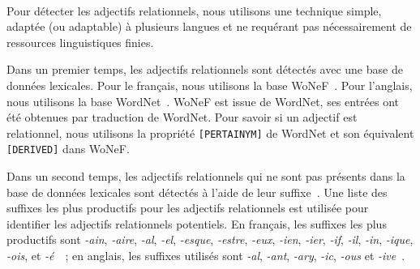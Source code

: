       ~\\Pour détecter les adjectifs relationnels, nous utilisons une technique
      simple, adaptée (ou adaptable) à plusieurs langues et ne requérant pas
      nécessairement de ressources linguistiques finies.

      Dans un premier temps, les adjectifs relationnels sont détectés avec une
      base de données lexicales. Pour le français, nous utilisons la base
      WoNeF~\cite{pradet2013wonef}. Pour l'anglais, nous
      utilisons la base  WordNet~\cite{miller1995wordnet}. WoNeF est issue de
      WordNet, ses entrées ont été obtenues par traduction de WordNet. Pour
      savoir si un adjectif est relationnel, nous utilisons la propriété
      \texttt{[PERTAINYM]} de WordNet et son équivalent \texttt{[DERIVED]} dans
      WoNeF.

      Dans un second temps, les adjectifs relationnels qui ne sont pas présents
      dans la base de données lexicales sont détectés à l'aide de leur
      suffixe~\cite{dubois1999derivation}. Une liste des suffixes les plus
      productifs pour les adjectifs relationnels est utilisée pour identifier
      les adjectifs relationnels potentiels. En français, les suffixes les plus
      productifs sont \textit{-ain}, \textit{-aire}, \textit{-al}, \textit{-el},
      \textit{-esque}, \textit{-estre}, \textit{-eux}, \textit{-ien},
      \textit{-ier}, \textit{-if}, \textit{-il}, \textit{-in}, \textit{-ique},
      \textit{-ois}, et
      \textit{-é}~\cite{harastani2013relationaladjectivetranslation}~; en
      anglais, les suffixes utilisés sont \textit{-al}, \textit{-ant},
      \textit{-ary}, \textit{-ic}, \textit{-ous} et
      \textit{-ive}~\cite{grabar2006terminologystructuring}.

